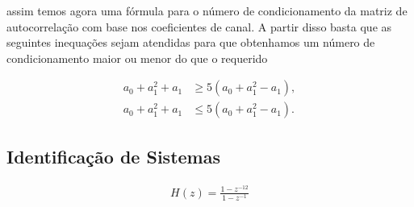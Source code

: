 \begin{enumerate}
        assim temos agora uma fórmula para o número de condicionamento da matriz de autocorrelação com base nos coeﬁcientes de canal. A partir disso basta que as seguintes inequações sejam atendidas para que
        obtenhamos um número de condicionamento maior ou menor do que o requerido

        \begin{align}
            a_{0} + a^{2}_{1} + a_{1} &\geq 5 (a_{0} + a^{2}_{1} - a_{1}), \\
            a_{0} + a^{2}_{1} + a_{1} &\leq 5 (a_{0} + a^{2}_{1} - a_{1}).
        \end{align}

\end{enumerate}


\clearpage


\subsection{Identificação de Sistemas} %

    
\begin{align}
    H(z) = \frac{1 - z^{-12}}{1 - z^{-1}}
\end{align}

